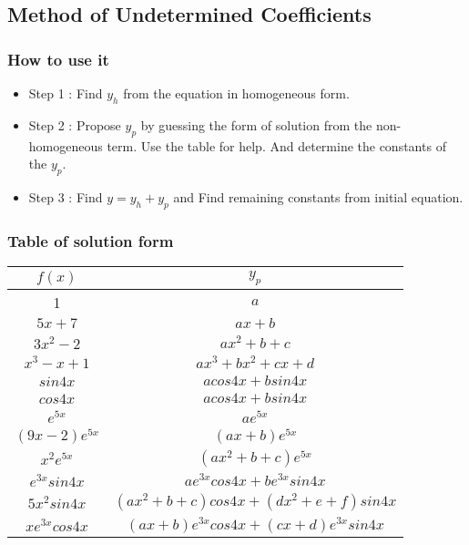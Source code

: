 \documentclass[12pt,a4paper]{article}
\begin{document}
	\subsection{Method of Undetermined Coefficients}
	\subsubsection{How to use it}
	\begin{itemize}
		\item Step 1 : Find \(y_h\) from the equation in homogeneous form.
		\item Step 2 : Propose \(y_p\) by guessing the form of solution from the non-homogeneous term. Use the table for help. And determine the constants of the \(y_p\).
		\item Step 3 : Find \(y = y_h + y_p\) and Find remaining constants from initial equation.
	\end{itemize}
	\subsubsection{Table of solution form}
	\begin{tabular}{|c|c|}
		\hline
		\(f(x)\)         & \(y_p\)                                 \\
		\hline
		1                & \(a\)                                   \\
		\hline
		\(5x+7\)         & \(ax+b\)                                \\
		\hline
		\(3x^2-2\)       & \(ax^2+b+c\)                            \\
		\hline
		\(x^3-x+1\)      & \(ax^3+bx^2+cx+d\)                      \\
		\hline
		\(sin4x\)        & \(acos4x+bsin4x\)                       \\
		\hline
		\(cos4x\)        & \(acos4x+bsin4x\)                       \\
		\hline
		\(e^{5x}\)       & \(ae^{5x}\)                             \\
		\hline
		\((9x-2)e^{5x}\) & \((ax+b)e^{5x}\)                        \\
		\hline
		\(x^2e^{5x}\)    & \((ax^2+b+c)e^{5x}\)                    \\
		\hline
		\(e^{3x}sin4x\)  & \(ae^{3x}cos4x+be^{3x}sin4x\)           \\
		\hline
		\(5x^2sin4x\)    & \((ax^2+b+c)cos4x+(dx^2+e+f)sin4x\)     \\
		\hline
		\(xe^{3x}cos4x\) & \((ax+b)e^{3x}cos4x+(cx+d)e^{3x}sin4x\) \\
		\hline
	\end{tabular}
	
\end{document}
